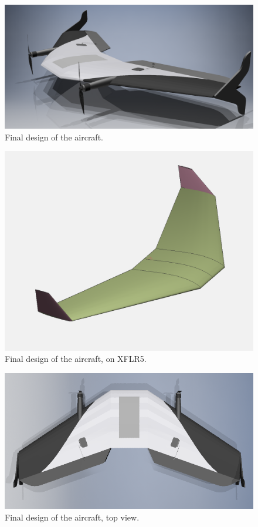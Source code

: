 \begin{figure}
\centering
  \includegraphics[width=\linewidth]{figs/finalrender.png}
  \caption{Final design of the aircraft.}
  \label{fig:finalrender}
\end{figure}

\begin{figure}
\centering
  \includegraphics[width=\linewidth]{figs/final.png}
  \caption{Final design of the aircraft, on XFLR5.}
  \label{fig:final}
\end{figure}
	


\begin{figure}
\centering
  \includegraphics[width=\linewidth]{figs/finalrendertop.png}
  \caption{Final design of the aircraft, top view.}
  \label{fig:finalrendertop}
\end{figure}


